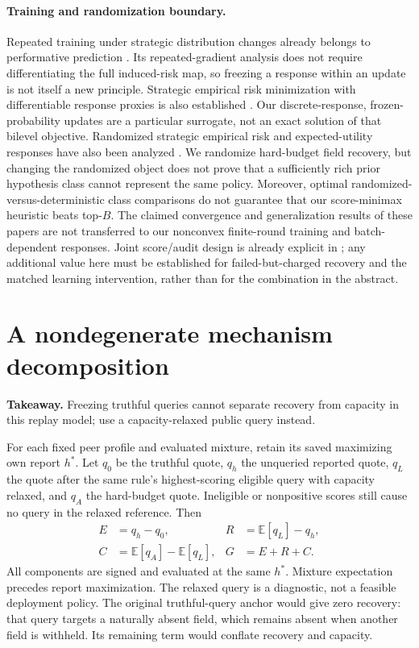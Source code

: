 \documentclass[11pt]{article}
\begin{document}
\paragraph{Training and randomization boundary.}
Repeated training under strategic distribution changes already belongs to
performative prediction \cite{performative}. Its repeated-gradient analysis does
not require differentiating the full induced-risk map, so freezing a response
within an update is not itself a new principle. Strategic empirical risk
minimization with differentiable response proxies is also established \cite{serm}.
Our discrete-response, frozen-probability updates are a particular surrogate,
not an exact solution of that bilevel objective. Randomized strategic empirical
risk and expected-utility responses have also been analyzed \cite{randomized}.
We randomize hard-budget field recovery, but changing the randomized object
does not prove that a sufficiently rich prior hypothesis class cannot represent
the same policy. Moreover, optimal randomized-versus-deterministic class
comparisons do not guarantee that our score-minimax heuristic beats top-$B$.
The claimed convergence and generalization results of these papers are not
transferred to our nonconvex finite-round training and batch-dependent responses.
Joint score/audit design is already explicit in \cite{auditrisk}; any additional
value here must be established for failed-but-charged recovery and the matched
learning intervention, rather than for the combination in the abstract.

\section{A nondegenerate mechanism decomposition}
\noindent\textbf{Takeaway.} Freezing truthful queries cannot separate recovery
from capacity in this replay model; use a capacity-relaxed public query instead.

For each fixed peer profile and evaluated mixture, retain its saved maximizing
own report $h^*$. Let $q_0$ be the truthful quote, $q_h$ the unqueried reported
quote, $q_L$ the quote after the same rule's highest-scoring eligible query with
capacity relaxed, and $q_A$ the hard-budget quote. Ineligible or nonpositive
scores still cause no query in the relaxed reference. Then
\begin{align}
E &= q_h-q_0, & R&=\mathbb{E}[q_L]-q_h,\\
C &=\mathbb{E}[q_A]-\mathbb{E}[q_L], & G&=E+R+C.
\end{align}
All components are signed and evaluated at the same $h^*$. Mixture expectation
precedes report maximization. The relaxed query is a diagnostic, not a feasible
deployment policy. The original truthful-query anchor would give zero recovery:
that query targets a naturally absent field, which remains absent when another
field is withheld. Its remaining term would conflate recovery and capacity.
\end{document}
